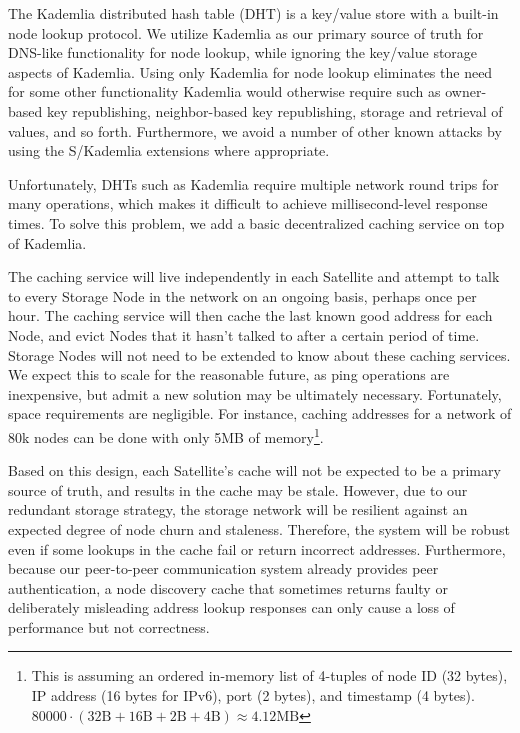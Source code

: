 \documentclass[8pt,fleqn,openany]{book}
\begin{document}
The Kademlia distributed hash table (DHT) is a key/value store with a built-in node lookup protocol.
We utilize Kademlia as our primary source of truth for DNS-like
functionality for node lookup, while ignoring the key/value storage aspects of
Kademlia.
Using only Kademlia for node lookup eliminates the need for some other
functionality Kademlia would otherwise require such as owner-based key
republishing, neighbor-based key republishing, storage and retrieval of values,
and so forth. Furthermore, we avoid a number of other known attacks by using the
S/Kademlia \cite{skad} extensions where appropriate.

Unfortunately, DHTs such as Kademlia require multiple network round trips for
many operations, which makes it difficult to achieve millisecond-level
response times. To solve this problem, we add a basic decentralized caching
service on top of Kademlia.

The caching service will live independently in each Satellite and
attempt to talk to every Storage Node in the network
on an ongoing basis, perhaps once per hour.
The caching service will then cache
the last known good address for each Node, and evict Nodes that it hasn't talked
to after a certain period of time.
Storage Nodes will not need to be extended to know about these caching services.
We expect this to scale for the
reasonable future, as ping operations are inexpensive, but admit a new solution
may be ultimately necessary.
Fortunately, space requirements are negligible. For instance, caching addresses
for a network of 80k nodes
can be done with only 5MB of memory\footnote{
This is assuming an ordered in-memory list of 4-tuples of node ID (32 bytes),
IP address (16 bytes for IPv6), port (2 bytes), and timestamp (4 bytes).
$80000\cdot(32 \mbox{B}+16 \mbox{B}+2 \mbox{B}+4 \mbox{B}) \approx 4.12 \mbox{MB}$
}.

Based on this design, each Satellite's cache will not be expected to be a primary source
of truth, and results in the cache may be stale. However, due to our redundant
storage strategy, the storage network will be resilient against an expected
degree of node churn and staleness.
Therefore, the system will be robust even if some lookups in the cache
fail or return incorrect addresses.
Furthermore, because our peer-to-peer communication
system already provides peer authentication, a node discovery cache that
sometimes returns faulty
or deliberately misleading address lookup responses can only cause a
loss of performance but not correctness.
\end{document}
